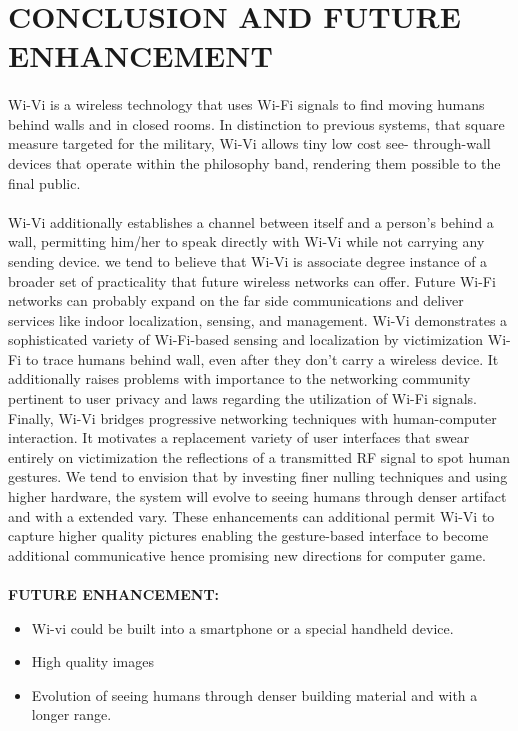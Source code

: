 \documentclass[a4paper,12pt,oneside]{article}
\begin{document}
\newpage
\section{CONCLUSION AND FUTURE ENHANCEMENT}
\paragraph{}
Wi-Vi is a wireless technology that uses Wi-Fi signals to find moving humans
behind walls and in closed rooms. In distinction to previous systems, that square measure
targeted for the military, Wi-Vi allows tiny low cost see- through-wall devices that operate within
the philosophy band, rendering them possible to the final public.
\paragraph{}
Wi-Vi additionally establishes a channel between itself and a person's behind a wall,
permitting him/her to speak directly with Wi-Vi while not carrying any sending device. we tend
to believe that Wi-Vi is associate degree instance of a broader set of practicality that future
wireless networks can offer. Future Wi-Fi networks can probably expand on the far side
communications and deliver services like indoor localization, sensing, and management. Wi-Vi
demonstrates a sophisticated variety of Wi-Fi-based sensing and localization by victimization
Wi-Fi to trace humans behind wall, even after they don't carry a wireless device. It additionally
raises problems with importance to the networking community pertinent to user privacy and laws
regarding the utilization of Wi-Fi signals. Finally, Wi-Vi bridges progressive networking
techniques with human-computer interaction. It motivates a replacement variety of user
interfaces that swear entirely on victimization the reflections of a transmitted RF signal to spot
human gestures. We tend to envision that by investing finer nulling techniques and using higher
hardware, the system will evolve to seeing humans through denser artifact and with a extended
vary. These enhancements can additional permit Wi-Vi to capture higher quality pictures
enabling the gesture-based interface to become additional communicative hence promising new
directions for computer game.

\paragraph{}
\textbf{FUTURE ENHANCEMENT:}
\begin{itemize}
	\item Wi-vi could be built into a smartphone or a special handheld device.
	\item High quality images
	\item Evolution of seeing humans through denser building material and with a longer range.
\end{itemize}
\end{document}
